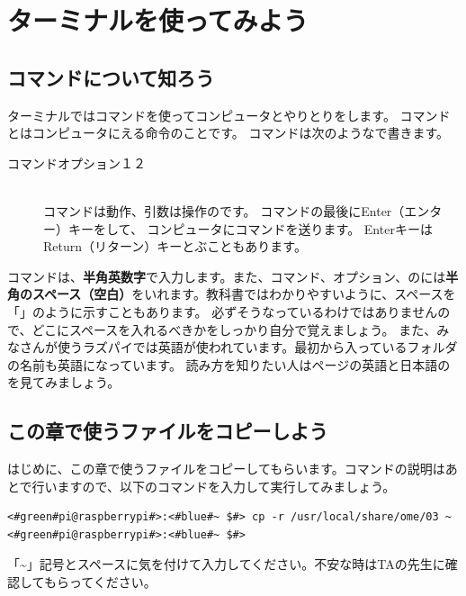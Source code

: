 
\section{ターミナルを使ってみよう}
\subsection{コマンドについて知ろう}

ターミナルではコマンドを使ってコンピュータとやりとりをします。
コマンドとはコンピュータにえる命令のことです。
コマンドは次のようなで書きます。

\begin{description}
\item[コマンド\textvisiblespace オプション\textvisiblespace {}１\textvisiblespace{}２]\mbox{}\\
コマンドは動作、引数は操作のです。
 コマンドの最後にEnter（エンター）キーをして、
 コンピュータにコマンドを送ります。
 EnterキーはReturn（リターン）キーとぶこともあります。
\end{description}

コマンドは、{\bf 半角英数字}で入力します。また、コマンド、オプション、のには{\bf 半角のスペース（空白）}をいれます。教科書ではわかりやすいように、スペースを「\textvisiblespace 」のように示すこともあります。
必ずそうなっているわけではありませんので、どこにスペースを入れるべきかをしっかり自分で覚えましょう。
また、みなさんが使うラズパイでは英語が使われています。最初から入っているフォルダの名前も英語になっています。
読み方を知りたい人は\pageref{英語と日本語の対応表}ページの英語と日本語のを見てみましょう。

\subsection{この章で使うファイルをコピーしよう}
はじめに、この章で使うファイルをコピーしてもらいます。コマンドの説明はあとで行いますので、以下のコマンドを入力して実行してみましょう。
\begin{lstlisting}[caption=使うファイルのコピー,label=workfilecopy]
<#green#pi@raspberrypi#>:<#blue#~ $#> cp -r /usr/local/share/ome/03 ~
<#green#pi@raspberrypi#>:<#blue#~ $#>
\end{lstlisting}
「\textasciitilde 」記号とスペースに気を付けて入力してください。不安な時はTAの先生に確認してもらってください。

